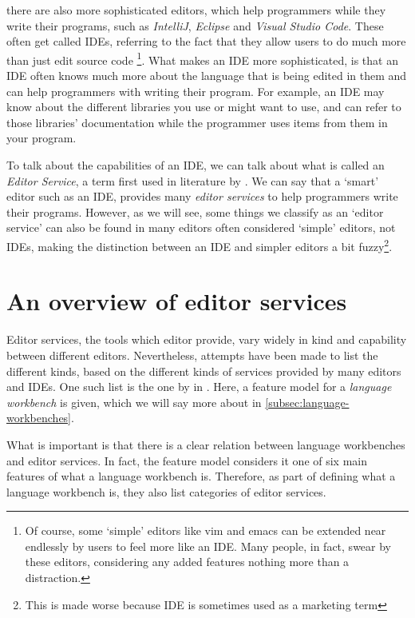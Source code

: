 there are also more sophisticated editors, which help programmers while they write their programs, such as \emph{IntelliJ}, \emph{Eclipse} and \emph{Visual Studio Code}.
These often get called \acfp{IDE}, referring to the fact that they allow users to do much more than just edit source code
\footnote{Of course, some `simple' editors like vim and emacs can be extended near endlessly by users to feel more like an \ac{IDE}. Many people, in fact, swear by these editors, considering any added features nothing more than a distraction.}.
What makes an \ac{IDE} more sophisticated, is that an \ac{IDE} often knows much more about the language that is being edited in them and can help programmers with writing their program.
For example, an \ac{IDE} may know about the different libraries you use or might want to use, and can refer to those libraries' documentation while the programmer uses items from them in your program.

To talk about the capabilities of an \ac{IDE}, we can talk about what is called an \emph{Editor Service}, a term first used in literature by \textcite{KatsKV08}.
We can say that a `smart' editor such as an \ac{IDE}, provides many \emph{editor services} to help programmers write their programs.
However, as we will see, some things we classify as an `editor service' can also be found in many editors often considered `simple' editors, not \acp{IDE}, making the distinction between an \ac{IDE} and simpler editors a bit fuzzy\footnote{This is made worse because \ac{IDE} is sometimes used as a marketing term}.

\section{An overview of editor services}
\label{sec:an-overview-of-editor-services}

Editor services, the tools which editor provide, vary widely in kind and capability between different editors.
Nevertheless, attempts have been made to list the different kinds, based on the different kinds of services provided by many editors and \acp{IDE}.
One such list is the one by \textcite{ErdwegSV13} in .
Here, a feature model for a \emph{language workbench} is given, which we will say more about in \cref{subsec:language-workbenches}.

What is important is that there is a clear relation between language workbenches and editor services.
In fact, the feature model considers it one of six main features of what a language workbench is.
Therefore, as part of defining what a language workbench is, they also list categories of editor services.


